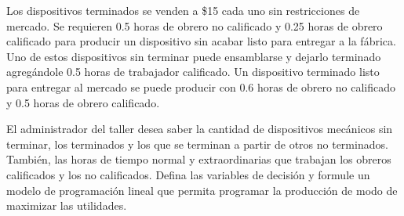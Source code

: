 \documentclass[letterpaper]{article}
\begin{document}
Los dispositivos terminados se venden a \$15 cada uno sin restricciones de mercado. Se requieren 0.5 horas de obrero no calificado y 0.25 horas de obrero calificado para producir un dispositivo sin acabar listo para entregar a la fábrica. Uno de estos dispositivos sin terminar puede ensamblarse y dejarlo terminado agregándole 0.5 horas de trabajador calificado. Un dispositivo terminado listo para entregar al mercado se puede producir con 0.6 horas de obrero no calificado y 0.5 horas de obrero calificado.

El administrador del taller desea saber la cantidad de dispositivos mecánicos sin terminar, los terminados y los que se terminan a partir de otros no terminados. También, las horas de tiempo normal y extraordinarias que trabajan los obreros calificados y los no calificados. Defina las variables de decisión y formule un modelo de programación lineal que permita programar la producción de modo de maximizar las utilidades.
\end{document}
